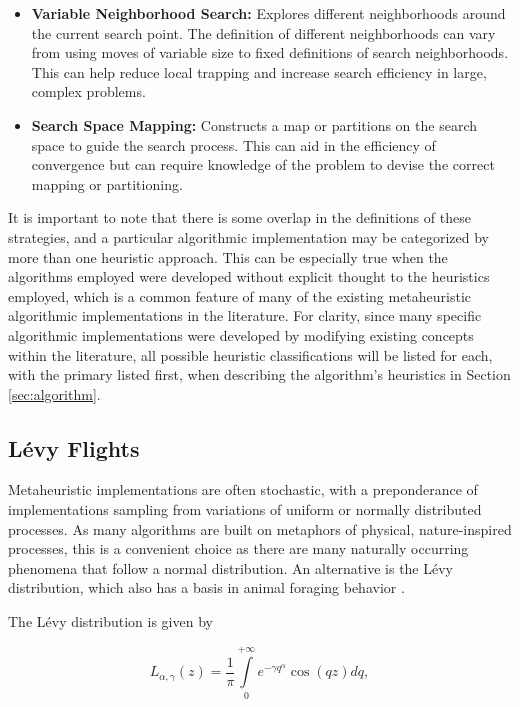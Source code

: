 \documentclass{article}                                                                           %
\begin{document}
\begin{itemize}
  \item \textbf{Variable Neighborhood Search:} Explores different neighborhoods around the current search point.  The definition of different neighborhoods can vary from using moves of variable size to fixed definitions of search neighborhoods.  This can help reduce local trapping and increase search efficiency in large, complex problems.              
  \item \textbf{Search Space Mapping:} Constructs a map or partitions on the search space to guide the search process.  This can aid in the efficiency of convergence but can require knowledge of the problem to devise the correct mapping or partitioning.  
\end{itemize}

It is important to note that there is some overlap in the definitions of these strategies, and a particular algorithmic implementation may be categorized by more than one heuristic approach.
This can be especially true when the algorithms employed were developed without explicit thought to the heuristics employed, which is a common feature of many of the existing metaheuristic algorithmic implementations in the literature.
For clarity, since many specific algorithmic implementations were developed by modifying existing concepts within the literature, all possible heuristic classifications will be listed for each, with the primary listed first, when describing the algorithm's heuristics in Section \ref{sec:algorithm}.

\subsection{Lévy Flights}
Metaheuristic implementations are often stochastic, with a preponderance of implementations sampling from variations of uniform or normally distributed processes.  
As many algorithms are built on metaphors of physical, nature-inspired processes, this is a convenient choice as there are many naturally occurring phenomena that follow a normal distribution.
An alternative is the Lévy distribution, which also has a basis in animal foraging behavior \cite{Levy1994, Zhao2015, Tran2004}.

The Lévy distribution is given by 

\begin{equation}
  L_{\alpha,\gamma}(z)=\frac{1}{\pi}\int \limits_{0}^{+\infty} e^{-\gamma q^{\alpha}} \cos(qz) dq,
\end{equation}
\end{document}
